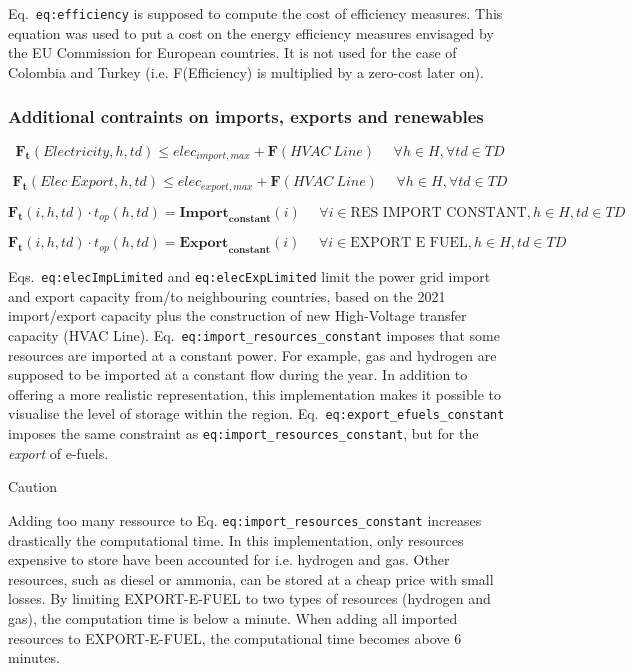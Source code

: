 \documentclass[
]{article}
\begin{document}
Eq.~\texttt{eq:efficiency} is supposed to compute the cost of efficiency
measures. This equation was used to put a cost on the energy efficiency
measures envisaged by the EU Commission for European countries. It is
not used for the case of Colombia and Turkey (i.e. F(Efficiency) is
multiplied by a zero-cost later on).

\subsubsection{Additional contraints on imports, exports and
renewables}\label{sssec_lp_imports_exports_renewables}

{\[\textbf{F}_{\textbf{t}}(Electricity,h,td) \leq  elec_{import,max} + \textbf{F}(HVAC~Line) ~~~~~~ \forall h \in H, \forall td \in TD\]}

{\[\textbf{F}_{\textbf{t}}(Elec~Export,h,td) \leq  elec_{export,max} + \textbf{F}(HVAC~Line) ~~~~~~ \forall h \in H, \forall td \in TD\]}

{\[\textbf{F}_{\textbf{t}}(i,h,td) \cdot t_{op} (h,td) =  \textbf{Import}_{\textbf{constant}}(i) ~~~~~~ \forall i \in \text{RES~IMPORT~CONSTANT}, h \in H, td \in TD\]}

{\[\textbf{F}_{\textbf{t}}(i,h,td) \cdot t_{op} (h,td) =  \textbf{Export}_{\textbf{constant}}(i) ~~~~~~ \forall i \in \text{EXPORT~E~FUEL}, h \in H, td \in TD\]}

Eqs.~\texttt{eq:elecImpLimited} and \texttt{eq:elecExpLimited} limit the
power grid import and export capacity from/to neighbouring countries,
based on the 2021 import/export capacity plus the construction of new
High-Voltage transfer capacity (HVAC Line).
Eq.~\texttt{eq:import\_resources\_constant} imposes that some resources
are imported at a constant power. For example, gas and hydrogen are
supposed to be imported at a constant flow during the year. In addition
to offering a more realistic representation, this implementation makes
it possible to visualise the level of storage within the region.
Eq.~\texttt{eq:export\_efuels\_constant} imposes the same constraint as
\texttt{eq:import\_resources\_constant}, but for the \emph{export} of
e-fuels.

Caution

Adding too many ressource to Eq. \texttt{eq:import\_resources\_constant}
increases drastically the computational time. In this implementation,
only resources expensive to store have been accounted for i.e. hydrogen
and gas. Other resources, such as diesel or ammonia, can be stored at a
cheap price with small losses. By limiting EXPORT-E-FUEL to two types of
resources (hydrogen and gas), the computation time is below a minute.
When adding all imported resources to EXPORT-E-FUEL, the computational
time becomes above 6 minutes.
\end{document}

